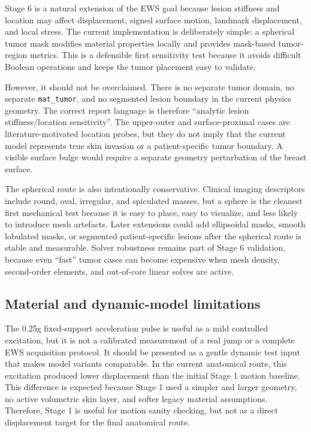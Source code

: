 Stage 6 is a natural extension of the EWS goal because lesion stiffness and location may affect displacement, signed surface motion, landmark displacement, and local stress. The current implementation is deliberately simple: a spherical tumor mask modifies material properties locally and provides mask-based tumor-region metrics. This is a defensible first sensitivity test because it avoids difficult Boolean operations and keeps the tumor placement easy to validate.

However, it should not be overclaimed. There is no separate tumor domain, no separate \texttt{mat\_tumor}, and no segmented lesion boundary in the current physics geometry. The correct report language is therefore ``analytic lesion stiffness/location sensitivity''. The upper-outer and surface-proximal cases are literature-motivated location probes, but they do not imply that the current model represents true skin invasion or a patient-specific tumor boundary. A visible surface bulge would require a separate geometry perturbation of the breast surface.

The spherical route is also intentionally conservative. Clinical imaging descriptors include round, oval, irregular, and spiculated masses, but a sphere is the cleanest first mechanical test because it is easy to place, easy to visualize, and less likely to introduce mesh artefacts. Later extensions could add ellipsoidal masks, smooth lobulated masks, or segmented patient-specific lesions after the spherical route is stable and measurable. Solver robustness remains part of Stage 6 validation, because even ``fast'' tumor cases can become expensive when mesh density, second-order elements, and out-of-core linear solves are active.

\subsection{Material and dynamic-model limitations}

The 0.25g fixed-support acceleration pulse is useful as a mild controlled excitation, but it is not a calibrated measurement of a real jump or a complete EWS acquisition protocol. It should be presented as a gentle dynamic test input that makes model variants comparable. In the current anatomical route, this excitation produced lower displacement than the initial Stage 1 motion baseline. This difference is expected because Stage 1 used a simpler and larger geometry, no active volumetric skin layer, and softer legacy material assumptions. Therefore, Stage 1 is useful for motion sanity checking, but not as a direct displacement target for the final anatomical route.

